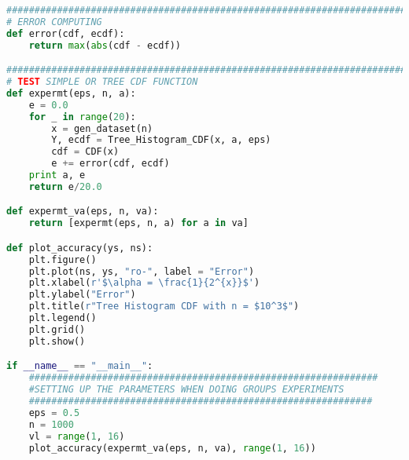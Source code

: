 \begin{lstlisting}[label=code-alg3, language=Python, caption=Python Code For Algorithm 2 Tree Histogram CDF]
#############################################################################
# ERROR COMPUTING
def error(cdf, ecdf):
	return max(abs(cdf - ecdf))

#############################################################################
# TEST SIMPLE OR TREE CDF FUNCTION
def expermt(eps, n, a):
	e = 0.0
	for _ in range(20):
		x = gen_dataset(n)
		Y, ecdf = Tree_Histogram_CDF(x, a, eps)
		cdf = CDF(x)
		e += error(cdf, ecdf)
	print a, e
	return e/20.0

def expermt_va(eps, n, va):
	return [expermt(eps, n, a) for a in va]

def plot_accuracy(ys, ns):
	plt.figure()
	plt.plot(ns, ys, "ro-", label = "Error")
	plt.xlabel(r'$\alpha = \frac{1}{2^{x}}$')
	plt.ylabel("Error")
	plt.title(r"Tree Histogram CDF with n = $10^3$")
	plt.legend()
	plt.grid()
	plt.show()

if __name__ == "__main__":
	##############################################################
	#SETTING UP THE PARAMETERS WHEN DOING GROUPS EXPERIMENTS
	#############################################################
	eps = 0.5
	n = 1000
	vl = range(1, 16)
	plot_accuracy(expermt_va(eps, n, va), range(1, 16))

\end{lstlisting}



